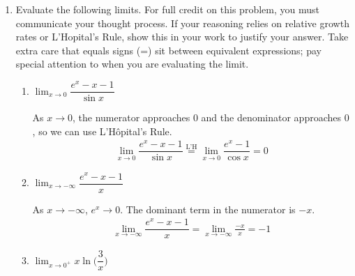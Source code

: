 \documentclass{article}
\begin{document}
\begin{enumerate}
    
    \begin{enumerate}
    \item 
    \begin{problem}
    Evaluate the following limits. For full credit on this problem, you must communicate your thought process. If your reasoning relies on relative growth rates or L'Hopital's Rule, show this in your work to justify your answer. Take extra care that equals signs (=) sit between equivalent expressions; pay special attention to when you are evaluating the limit.
    \end{problem}
    \begin{enumerate}
        \item 
        \begin{problem}
        $\displaystyle\lim_{x\to 0}\dfrac{e^x-x-1}{\sin x}$
        \end{problem}
        \pspace{\vfill}

        \begin{solution}
            As $x\to 0$, the numerator approaches $0$ and the denominator approaches $0$, so we can use L'Hôpital's Rule.
            \begin{align*}
                \lim_{x\to 0}\dfrac{e^x-x-1}{\sin x} \stackrel{\text{L'H}}{=} \lim_{x\to 0}\dfrac{e^x-1}{\cos x}
                = \boxed{0}
            \end{align*}
        \end{solution}
        \item 
        \begin{problem}
        $\displaystyle\lim_{x\to -\infty}\dfrac{e^x-x-1}{x}$
        \end{problem}
        \pspace{\vfill}

        \begin{solution}
            As $x\to -\infty$, $e^x \to 0$. The dominant term in the numerator is $-x$.
            \begin{align*}
                \lim_{x\to -\infty}\dfrac{e^x-x-1}{x} = \lim_{x\to -\infty} \frac{-x}{x} = \boxed{-1}
            \end{align*}
        \end{solution}
        
        \pspace{\newpage}
        \item 
        \begin{problem}
        $\displaystyle\lim_{x\to 0^+} x
        \ln\Big(\dfrac{3}{x}\Big)$
        \end{problem}
        \pspace{\vfill}


\end{enumerate}
\end{enumerate}
\end{enumerate}
\end{document}
